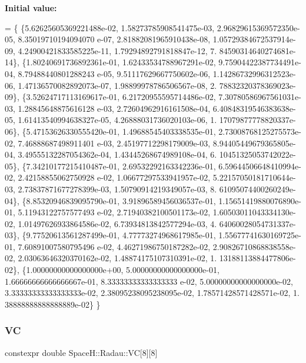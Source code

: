 {\bfseries Initial value\+:}
\begin{DoxyCode}
=
        \{
            \{5.62625605369221488e-02, 1.58273785908541475e-03, 2.96829615369572350e-05, 8.35019710194094070
      e-07, 2.81882081965910438e-08, 1.05729384672537914e-09, 4.24900421833585225e-11, 1.79294892791818847e-12, 7.
      84590314640274681e-14\},
            \{1.80240691736892361e-01, 1.62433534788967291e-02, 9.75904422387734491e-04, 8.79488440801288243
      e-05, 9.51117629667750602e-06, 1.14286732996312523e-06, 1.47136570082892073e-07, 1.98899978786506567e-08, 2.
      78832320378369023e-09\},
            \{3.52624717113169617e-01, 6.21720955595714486e-02, 7.30780586967561031e-03, 1.28845648875616128
      e-03, 2.72604962916161508e-04, 6.40848319546383638e-05, 1.61413540994638327e-05, 4.26888031736020103e-06, 1.
      17079877778820337e-06\},
            \{5.47153626330555420e-01, 1.49688545403338535e-01, 2.73008768125275573e-02, 7.46888687498911401
      e-03, 2.45197712298179009e-03, 8.94405449679365805e-04, 3.49555132287054362e-04, 1.43445268674989108e-04, 6.
      10451325053742022e-05\},
            \{7.34210177215410487e-01, 2.69532292163342236e-01, 6.59644506648410994e-02, 2.42158855062750928
      e-02, 1.06677297533941957e-02, 5.22157050181710644e-03, 2.73837871677278399e-03, 1.50790914219349057e-03, 8.
      61095074400260249e-04\},
            \{8.85320946839095790e-01, 3.91896589456036537e-01, 1.15651419880076890e-01, 5.11943122757577493
      e-02, 2.71940382100501173e-02, 1.60503011043334130e-02, 1.01497626933864586e-02, 6.73934813842577294e-03, 4.
      64060028054731337e-03\},
            \{9.77520613561287499e-01, 4.77773274968617985e-01, 1.55677741630169725e-01, 7.60891007580795496
      e-02, 4.46271986750187282e-02, 2.90826710868838558e-02, 2.03063646320370162e-02, 1.48874175107310391e-02, 1.
      13188113884477806e-02\},
            \{1.00000000000000000e+00, 5.00000000000000000e-01, 1.66666666666666667e-01, 8.33333333333333333
      e-02, 5.00000000000000000e-02, 3.33333333333333333e-02, 2.38095238095238095e-02, 1.78571428571428571e-02, 1.
      38888888888888889e-02\}
        \}
\end{DoxyCode}
\mbox{\label{namespace_space_h_1_1_radau_a9fb1c247de193221b47ce294964aa06b}} 
\subsubsection{\texorpdfstring{VC}{VC}}
{\footnotesize\ttfamily constexpr double Space\+H\+::\+Radau\+::\+VC\mbox{[}8\mbox{]}\mbox{[}8\mbox{]}}

